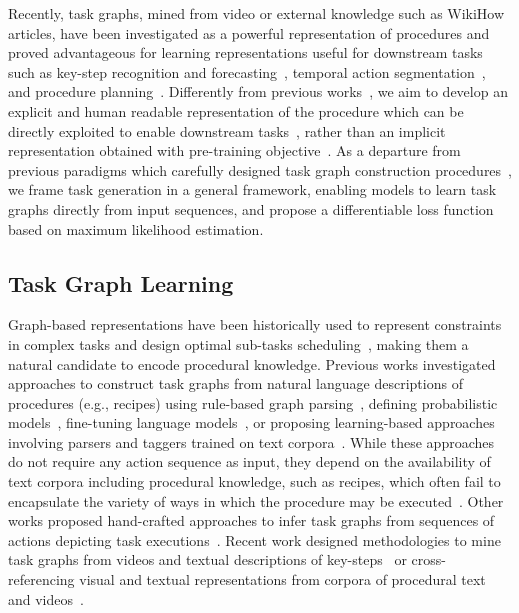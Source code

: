 Recently, task graphs, mined from video or external knowledge such as WikiHow articles, have been investigated as a powerful representation of procedures and proved advantageous for learning representations useful for downstream tasks such as key-step recognition and forecasting~\cite{ashutosh2024video,grauman2023ego,zhou2023procedure}, temporal action segmentation~\cite{nagasinghe2024not}, and procedure planning~\cite{shen2024progress}.
Differently from previous works~\cite{narasimhan2023learning,zhong2023learning}, we aim to develop an explicit and human readable representation of the procedure which can be directly exploited to enable downstream tasks~\cite{ashutosh2024video}, rather than an implicit representation obtained with pre-training objective~\cite{zhou2023procedure,narasimhan2023learning}. 
As a departure from previous paradigms which carefully designed task graph construction procedures~\cite{ashutosh2024video,zhou2023procedure,sohn2020meta,jang2023multimodal}, we frame task generation in a general framework, enabling models to learn task graphs directly from input sequences, and propose a differentiable loss function based on maximum likelihood estimation.

 

\subsection{Task Graph Learning}
\label{sec:task_graph_construction}
Graph-based representations have been historically used to
represent constraints in complex tasks and design optimal sub-tasks scheduling~\cite{skiena1998algorithm}, making them a natural candidate to encode procedural knowledge.
Previous works investigated approaches to construct task graphs from natural language descriptions of procedures (e.g., recipes) using rule-based graph parsing~\cite{dvornik2022graph2vid,schumacher2012extraction}, defining probabilistic models~\cite{kiddon2015mise}, fine-tuning language models~\cite{sakaguchi2021proscript}, or proposing learning-based approaches~\cite{dvornik2022graph2vid} involving parsers and taggers trained on text corpora~\cite{donatelli2021aligning,yamakata2020english}. While these approaches do not require any action sequence as input, they depend on the availability of text corpora including procedural knowledge, such as recipes, which often fail to encapsulate the variety of ways in which the procedure may be executed~\cite{ashutosh2024video}. 
Other works proposed hand-crafted approaches to infer task graphs from sequences of actions depicting task executions~\cite{sohn2020meta,jang2023multimodal}. 
Recent work designed methodologies to mine task graphs from videos and textual descriptions of key-steps~\cite{ashutosh2024video} or cross-referencing visual and textual representations from corpora of procedural text and videos~\cite{zhou2023procedure}.

